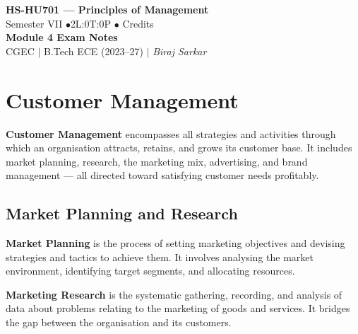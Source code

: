 \documentclass[12pt,a4paper]{article}
\begin{document}

\begin{center}
  {\LARGE\bfseries\color{myred} HS-HU701 --- Principles of Management}\\[5pt]
  {\normalsize\color{mydark} Semester VII \quad$\bullet$\quad 2L:0T:0P \quad$\bullet$ Credits}\\[3pt]
  {\normalsize\color{myteal}\textbf{Module 4 Exam Notes}}\\[3pt]
  {\small\color{mydark} CGEC \;$|$\; B.Tech ECE (2023--27) \;$|$\; \textit{Biraj Sarkar}}
\end{center}
\vspace{2pt}
\noindent{\color{myred}\rule{\linewidth}{1.5pt}}
\vspace{2pt}

\hypersetup{linkcolor=mydark}
\tableofcontents
\hypersetup{linkcolor=myteal}
\newpage

\section{Customer Management}

\begin{tcolorbox}[defbox, title={\textbf{Customer Management --- Overview}}]
\textbf{Customer Management} encompasses all strategies and activities through which an organisation attracts, retains, and grows its customer base. It includes market planning, research, the marketing mix, advertising, and brand management --- all directed toward satisfying customer needs profitably.
\end{tcolorbox}

\subsection{Market Planning and Research}

\begin{tcolorbox}[defbox, title={\textbf{Market Planning and Marketing Research}}]
\textbf{Market Planning} is the process of setting marketing objectives and devising strategies and tactics to achieve them. It involves analysing the market environment, identifying target segments, and allocating resources.
\par\vspace{3pt}
\textbf{Marketing Research} is the systematic gathering, recording, and analysis of data about problems relating to the marketing of goods and services. It bridges the gap between the organisation and its customers.
\end{tcolorbox}
\end{document}
